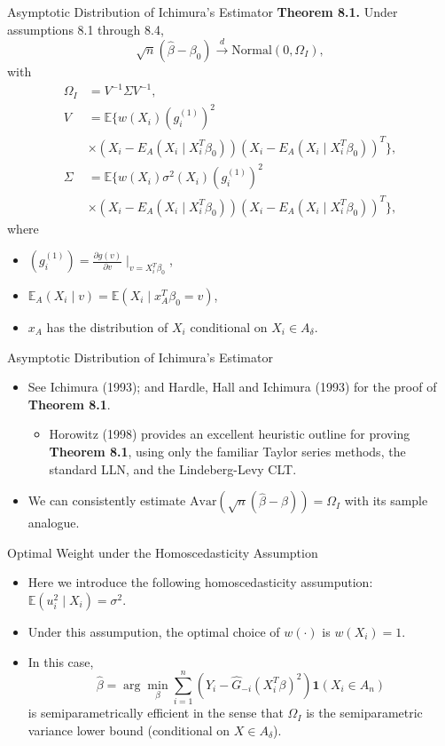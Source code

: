 \documentclass[xcolor=svgnames,dvipdfmx,cjk]{beamer}
\theoremstyle{example}
\def\Avar{\text{Avar}}
\def\E{\mathbb{E}}
\def\darrow{\xrightarrow{d}}
\begin{document}
\begin{frame}{Asymptotic Distribution of Ichimura's Estimator}
\textbf{Theorem 8.1.} Under assumptions 8.1 through 8.4,
    \[ \sqrt{n}(\hat{\beta} - \beta_0)
      \darrow \text{Normal} (0, \Omega_I),
    \]
with
  \begin{align*}
    \Omega_I &= V^{-1} \Sigma V^{-1}, \\
    V &= \E\{
      w(X_i) (g_i^{(1)})^2 \\
      & \times (X_i - E_A(X_i\mid X_i^T \beta_0)) (X_i - E_A(X_i\mid X_i^T \beta_0))^T 
    \}, \\
    \Sigma &= \E \{
      w(X_i) \sigma^2(X_i) (g_i^{(1)})^2 \\
      & \times (X_i - E_A(X_i\mid X_i^T \beta_0)) (X_i - E_A(X_i\mid X_i^T \beta_0))^T 
    \},
  \end{align*}
  where
  \begin{itemize}
    \item $(g_i^{(1)}) = \frac{\partial g(v)}{\partial v}\mid_{v= X_i^T \beta_0}$,
    \item $\E_A (X_i\mid v) = \E(X_i \mid x_A^T\beta_0 = v)$,
    \item $x_A$ has the distribution of $X_i$ conditional on $X_i \in A_\delta$.
  \end{itemize}
\end{frame}

\begin{frame}{Asymptotic Distribution of Ichimura's Estimator}
\begin{itemize}
  \item See Ichimura (1993); and Hardle, Hall and Ichimura (1993) for the proof of \textbf{Theorem 8.1}.
      \begin{itemize}
        \item Horowitz (1998) provides an excellent heuristic outline for proving \textbf{Theorem 8.1}, 
              using only the familiar Taylor series methods, the standard LLN, and the Lindeberg-Levy CLT.
      \end{itemize}
  \item We can consistently estimate 
        $\Avar\left(\sqrt{n}(\hat{\beta} - \beta)\right) = \Omega_I$ 
        with its sample analogue.
\end{itemize}
\end{frame}

\begin{frame}{Optimal Weight under the Homoscedasticity Assumption}
\begin{itemize}
  \item Here we introduce the following homoscedasticity assumpution:
        $\E(u_i^2 \mid X_i) = \sigma^2$.
  \item Under this assumpution, the optimal choice of $w(\cdot)$ is $w(X_i)=1$.
  \item In this case, 
        \[ \hat{\beta} = \arg\min_{\beta} \sum_{i=1}^{n} (Y_i - \hat{G}_{-i}(X_i^{T}\beta)^2)\mathbf{1}(X_i \in A_n) \]
        is \alert{semiparametrically efficient} in the sense that 
        $\Omega_I$ is \alert{the semiparametric variance lower bound} (conditional on $X \in A_\delta$).
\end{itemize}
\end{frame}
\end{document}
